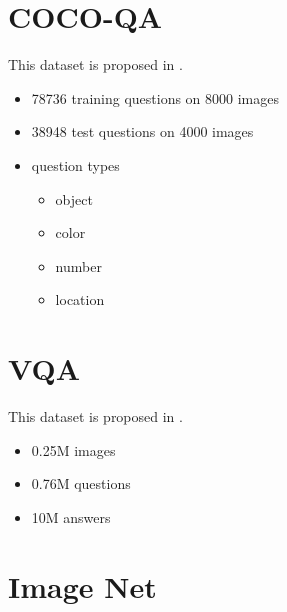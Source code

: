 \section{COCO-QA}
This dataset is proposed in \cite{coco-qa}.
\begin{itemize}
	\item 78736 training questions on 8000 images
	\item 38948 test questions on 4000 images
	\item question types
	\begin{itemize}
		\item object
		\item color
		\item number
		\item location
	\end{itemize}
\end{itemize}

\section{VQA}
This dataset is proposed in \cite{VQA}.

\begin{itemize}
	\item 0.25M images
	\item  0.76M questions
	\item  10M answers
\end{itemize}



\section{Image Net}
\cite{Image-Net}











